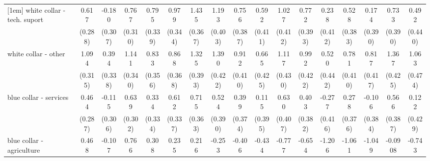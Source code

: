 {\begin{tabular}{l*{16}{c}}
[1em]
white collar - tech. suport&       0.617\sym{*}  &      -0.180         &       0.767\sym{*}  &       0.795\sym{*}  &       0.979\sym{**} &       1.435\sym{***}&       1.193\sym{**} &       0.756         &       0.592         &       1.027\sym{*}  &       0.772\sym{*}  &       0.238         &       0.528         &       0.174         &       0.733         &       0.492         \\
                    &     (0.288)         &     (0.307)         &     (0.310)         &     (0.339)         &     (0.344)         &     (0.367)         &     (0.403)         &     (0.387)         &     (0.411)         &     (0.412)         &     (0.393)         &     (0.412)         &     (0.383)         &     (0.390)         &     (0.390)         &     (0.440)         \\
[1em]
white collar - other&       1.094\sym{***}&       0.394         &       1.141\sym{***}&       0.833\sym{*}  &       0.868\sym{*}  &       1.325\sym{***}&       1.390\sym{***}&       0.912\sym{*}  &       0.665         &       1.117\sym{**} &       0.992\sym{*}  &       0.520         &       0.781         &       0.817\sym{*}  &       1.367\sym{**} &       1.063\sym{*}  \\
                    &     (0.315)         &     (0.338)         &     (0.340)         &     (0.356)         &     (0.368)         &     (0.393)         &     (0.422)         &     (0.410)         &     (0.425)         &     (0.430)         &     (0.422)         &     (0.442)         &     (0.410)         &     (0.417)         &     (0.425)         &     (0.474)         \\
[1em]
blue collar - services&       0.464         &      -0.115         &       0.639\sym{*}  &       0.334         &       0.612         &       0.715\sym{*}  &       0.524         &       0.399         &       0.115         &       0.630         &       0.403         &      -0.277         &       0.278         &      -0.106         &       0.566         &       0.122         \\
                    &     (0.287)         &     (0.306)         &     (0.302)         &     (0.334)         &     (0.337)         &     (0.363)         &     (0.390)         &     (0.374)         &     (0.395)         &     (0.407)         &     (0.382)         &     (0.416)         &     (0.376)         &     (0.384)         &     (0.387)         &     (0.429)         \\
[1em]
blue collar - agriculture&       0.468         &      -0.107         &       0.766         &       0.308         &       0.235         &       0.216         &      -0.253         &      -0.406         &      -0.434         &      -0.777         &      -0.654         &      -1.206\sym{*}  &      -1.061\sym{*}  &      -1.049\sym{*}  &     -0.0908         &      -0.743         \\

\end{tabular}}
